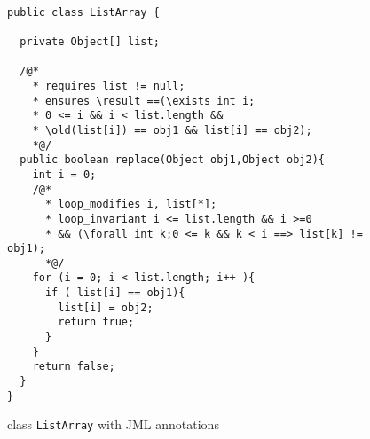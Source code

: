 \begin{figure}[ht!]
\begin{lstlisting} 

public class ListArray {

  private Object[] list;

  /@*
    * requires list != null;
    * ensures \result ==(\exists int i; 
    * 0 <= i && i < list.length && 
    * \old(list[i]) == obj1 && list[i] == obj2);
    *@/
  public boolean replace(Object obj1,Object obj2){
    int i = 0;
    /@*
      * loop_modifies i, list[*];
      * loop_invariant i <= list.length && i >=0 
      * && (\forall int k;0 <= k && k < i ==> list[k] != obj1);
      *@/
    for (i = 0; i < list.length; i++ ){
      if ( list[i] == obj1){
        list[i] = obj2;
        return true;	
      }
    }
    return false;
  }
}
\end{lstlisting}
\caption{\sc class \mbox{\rm \lstinline!ListArray!} with JML annotations} 
\label{replaceSrc}
\end{figure}



